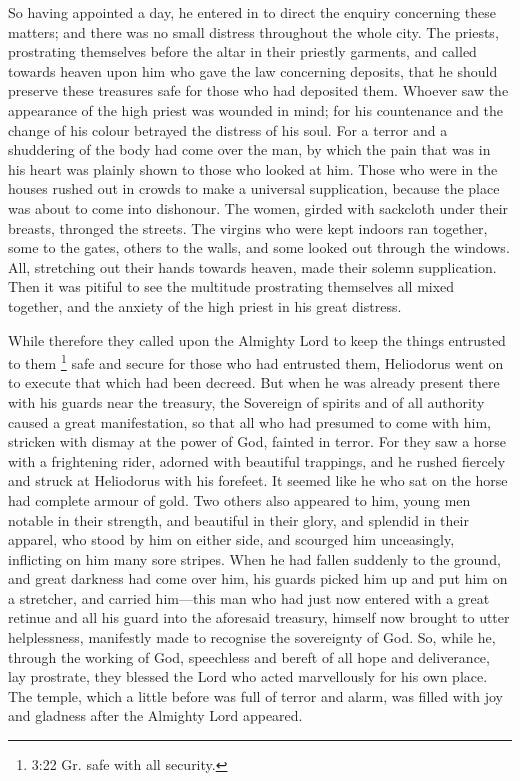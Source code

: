 So having appointed a day, he entered in to direct the
enquiry concerning these matters; and there was no small distress
throughout the whole city.  The priests, prostrating
themselves before the altar in their priestly garments, and called
towards heaven upon him who gave the law concerning deposits, that he
should preserve these treasures safe for those who had deposited them.
 Whoever saw the appearance of the high priest was wounded
in mind; for his countenance and the change of his colour betrayed the
distress of his soul.  For a terror and a shuddering of the
body had come over the man, by which the pain that was in his heart was
plainly shown to those who looked at him.  Those who were
in the houses rushed out in crowds to make a universal supplication,
because the place was about to come into dishonour.  The
women, girded with sackcloth under their breasts, thronged the streets.
The virgins who were kept indoors ran together, some to the gates,
others to the walls, and some looked out through the windows.
 All, stretching out their hands towards heaven, made their
solemn supplication.  Then it was pitiful to see the
multitude prostrating themselves all mixed together, and the anxiety of
the high priest in his great distress.

 While therefore they called upon the Almighty Lord to keep
the things entrusted to them \footnote{3:22 Gr. safe with all security.}
safe and secure for those who had entrusted them, 
Heliodorus went on to execute that which had been decreed. 
But when he was already present there with his guards near the treasury,
the Sovereign of spirits and of all authority caused a great
manifestation, so that all who had presumed to come with him, stricken
with dismay at the power of God, fainted in terror.  For
they saw a horse with a frightening rider, adorned with beautiful
trappings, and he rushed fiercely and struck at Heliodorus with his
forefeet. It seemed like he who sat on the horse had complete armour of
gold.  Two others also appeared to him, young men notable
in their strength, and beautiful in their glory, and splendid in their
apparel, who stood by him on either side, and scourged him unceasingly,
inflicting on him many sore stripes.  When he had fallen
suddenly to the ground, and great darkness had come over him, his guards
picked him up and put him on a stretcher,  and carried
him---this man who had just now entered with a great retinue and all his
guard into the aforesaid treasury, himself now brought to utter
helplessness, manifestly made to recognise the sovereignty of God.
 So, while he, through the working of God, speechless and
bereft of all hope and deliverance, lay prostrate,  they
blessed the Lord who acted marvellously for his own place. The temple,
which a little before was full of terror and alarm, was filled with joy
and gladness after the Almighty Lord appeared.

